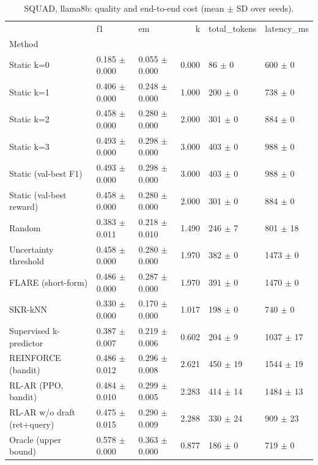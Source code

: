 \begin{table}
\caption{SQUAD, llama8b: quality and end-to-end cost (mean $\pm$ SD over seeds).}
\begin{tabular}{lllrll}
\toprule
 & f1 & em & k & total_tokens & latency_ms \\
Method &  &  &  &  &  \\
\midrule
Static k=0 & 0.185 $\pm$ 0.000 & 0.055 $\pm$ 0.000 & 0.000 & 86 $\pm$ 0 & 600 $\pm$ 0 \\
Static k=1 & 0.406 $\pm$ 0.000 & 0.248 $\pm$ 0.000 & 1.000 & 200 $\pm$ 0 & 738 $\pm$ 0 \\
Static k=2 & 0.458 $\pm$ 0.000 & 0.280 $\pm$ 0.000 & 2.000 & 301 $\pm$ 0 & 884 $\pm$ 0 \\
Static k=3 & 0.493 $\pm$ 0.000 & 0.298 $\pm$ 0.000 & 3.000 & 403 $\pm$ 0 & 988 $\pm$ 0 \\
Static (val-best F1) & 0.493 $\pm$ 0.000 & 0.298 $\pm$ 0.000 & 3.000 & 403 $\pm$ 0 & 988 $\pm$ 0 \\
Static (val-best reward) & 0.458 $\pm$ 0.000 & 0.280 $\pm$ 0.000 & 2.000 & 301 $\pm$ 0 & 884 $\pm$ 0 \\
Random & 0.383 $\pm$ 0.011 & 0.218 $\pm$ 0.010 & 1.490 & 246 $\pm$ 7 & 801 $\pm$ 18 \\
Uncertainty threshold & 0.458 $\pm$ 0.000 & 0.280 $\pm$ 0.000 & 1.970 & 382 $\pm$ 0 & 1473 $\pm$ 0 \\
FLARE (short-form) & 0.486 $\pm$ 0.000 & 0.287 $\pm$ 0.000 & 1.970 & 391 $\pm$ 0 & 1470 $\pm$ 0 \\
SKR-kNN & 0.330 $\pm$ 0.000 & 0.170 $\pm$ 0.000 & 1.017 & 198 $\pm$ 0 & 740 $\pm$ 0 \\
Supervised k-predictor & 0.387 $\pm$ 0.007 & 0.219 $\pm$ 0.006 & 0.602 & 204 $\pm$ 9 & 1037 $\pm$ 17 \\
REINFORCE (bandit) & 0.486 $\pm$ 0.012 & 0.296 $\pm$ 0.008 & 2.621 & 450 $\pm$ 19 & 1544 $\pm$ 19 \\
RL-AR (PPO, bandit) & 0.484 $\pm$ 0.010 & 0.299 $\pm$ 0.005 & 2.283 & 414 $\pm$ 14 & 1484 $\pm$ 13 \\
RL-AR w/o draft (ret+query) & 0.475 $\pm$ 0.015 & 0.290 $\pm$ 0.009 & 2.288 & 330 $\pm$ 24 & 909 $\pm$ 23 \\
Oracle (upper bound) & 0.578 $\pm$ 0.000 & 0.363 $\pm$ 0.000 & 0.877 & 186 $\pm$ 0 & 719 $\pm$ 0 \\
\bottomrule
\end{tabular}
\end{table}

